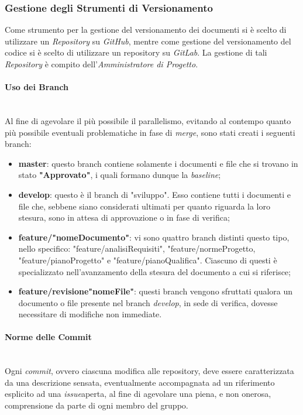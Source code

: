 \subsubsection{Gestione degli Strumenti di Versionamento}\label{ProcessiOrganizzativi_Procedure_GestioneStrumentiVersionamento}
	Come strumento per la gestione del versionamento dei documenti si è scelto di utilizzare un \textit{Repository} su \textit{GitHub}, mentre come gestione del versionamento del codice si è scelto di utilizzare un repository su \textit{GitLab}. La gestione di tali \textit{Repository} è compito dell'\textit{Amministratore di Progetto}.

\paragraph{Uso dei Branch} ~\\
	Al fine di agevolare il più possibile il parallelismo, evitando al contempo quanto più possibile eventuali problematiche in fase di \textit{merge}\glossario, sono stati creati i seguenti branch\glossario:
	\begin{itemize}
	\item \textbf{master}: questo branch contiene solamente i documenti e file che si trovano in stato \textbf{"Approvato"}, i quali formano dunque la \textit{baseline}\glossario;
	\item \textbf{develop}: questo è il branch di "sviluppo". Esso contiene tutti i documenti e file che, sebbene siano considerati ultimati per quanto riguarda la loro stesura, sono in attesa di approvazione o in fase di verifica;
	\item \textbf{feature/"nomeDocumento"}: vi sono quattro branch distinti questo tipo, nello specifico: "feature/analisiRequisiti", "feature/normeProgetto, "feature/pianoProgetto" e "feature/pianoQualifica". Ciascuno di questi è specializzato nell'avanzamento della stesura del documento a cui si riferisce;
	\item \textbf{feature/revisione"nomeFile"}: questi branch vengono sfruttati qualora un documento o file presente nel branch \textit{develop}, in sede di verifica, dovesse necessitare di modifiche non immediate.
	\end{itemize}

\paragraph{Norme delle Commit} ~\\
	Ogni \textit{commit}\glossario, ovvero ciascuna modifica alle repository, deve essere caratterizzata da una descrizione sensata, eventualmente accompagnata ad un riferimento esplicito ad una \textit{issue}\glossario aperta, al fine di agevolare una piena, e non onerosa, comprensione da parte di ogni membro del gruppo.

